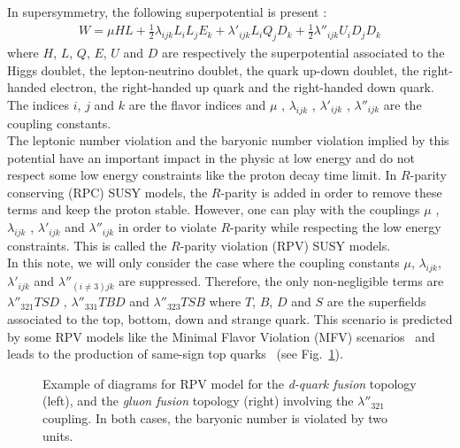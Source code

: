  In supersymmetry, the following superpotential is present :
 \begin{align}
   W = \mu H L + \frac{1}{2} \lambda_{ijk} L_i L_j E_k + \lambda'_{ijk} L_i Q_j D_k + \frac{1}{2} \lambda''_{ijk} U_i D_j D_k
   \label{rpvpotential}
 \end{align}
 where $H$, $L$, $Q$, $E$, $U$ and $D$ are respectively the superpotential associated to the Higgs doublet, the lepton-neutrino doublet, the quark up-down doublet, the right-handed electron, the right-handed up quark and the right-handed down quark.
 The indices $i$, $j$ and $k$ are the flavor indices and $\mu$ , $\lambda_{ijk}$ , $\lambda'_{ijk}$ , $\lambda''_{ijk}$ are the coupling constants.
\\

 The leptonic number violation and the baryonic number violation implied by this potential have an important impact in the physic at low energy
 and do not respect some low energy constraints like the proton decay time limit.
 In $R$-parity conserving (RPC) SUSY models, the $R$-parity is added in order to remove these terms and keep the proton stable.
 However, one can play with the couplings $\mu$ , $\lambda_{ijk}$ , $\lambda'_{ijk}$ and $\lambda''_{ijk}$ in order to violate $R$-parity while respecting the low energy constraints.
 This is called the $R$-parity violation (RPV) SUSY models.
\\

 In this note, we will only consider the case where the coupling constants $\mu$, $\lambda_{ijk}$, $\lambda'_{ijk}$ and $\lambda''_{(i \neq 3) jk}$ are suppressed.
 Therefore, the only non-negligible terms are $\lambda''_{321}TSD$ , $\lambda''_{331}TBD$ and $\lambda''_{323}TSB$ where $T$, $B$, $D$ and $S$ are the superfields associated to the top, bottom, down and strange quark.
 This scenario is predicted by some RPV models like the Minimal Flavor Violation (MFV) scenarios~\cite{Nikolidakis:2007fc,Csaki:2011ge} and leads to the production of same-sign top quarks~\cite{Durieux:2013uqa} (see Fig.~\ref{fig:rpv_diagram}).

\begin{figure}[h!]
\centering
{}
\caption{Example of diagrams for RPV model for the \textit{d-quark fusion} topology (left), and the \textit{gluon fusion} topology (right) involving the $\lambda''_{321}$ coupling. In both cases, the baryonic number is violated by two units. }
\label{fig:rpv_diagram}
\end{figure}

